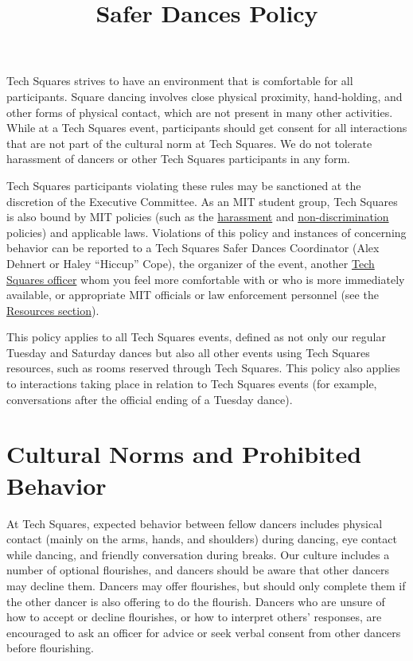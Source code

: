 \documentclass{article}
\title{Safer Dances Policy}
\date{}
\begin{document}
\maketitle

Tech Squares strives to have an environment that is comfortable for all participants. Square dancing involves close physical proximity, hand-holding, and other forms of physical contact, which are not present in many other activities. While at a Tech Squares event, participants should get consent for all interactions that are not part of the cultural norm at Tech Squares. We do not tolerate harassment of dancers or other Tech Squares participants in any form.

Tech Squares participants violating these rules may be sanctioned at the discretion of the Executive Committee. As an MIT student group, Tech Squares is also bound by MIT policies (such as the \href{http://handbook.mit.edu/harassment}{harassment} and \href{http://web.mit.edu/referencepubs/nondiscrimination/}{non-discrimination} policies) and applicable laws. Violations of this policy and instances of concerning behavior can be reported to a Tech Squares Safer Dances Coordinator (Alex Dehnert or Haley ``Hiccup'' Cope), the organizer of the event, another \href{http://www.mit.edu/\~{}tech-squares/officers.html}{Tech Squares officer} whom you feel more comfortable with or who is more immediately available, or appropriate MIT officials or law enforcement personnel (see the \hyperref[sec:resources]{Resources section}).

This policy applies to all Tech Squares events, defined as not only our regular Tuesday and Saturday dances but also all other events using Tech Squares resources, such as rooms reserved through Tech Squares. This policy also applies to interactions taking place in relation to Tech Squares events (for example, conversations after the official ending of a Tuesday dance).

\section{Cultural Norms and Prohibited Behavior}

At Tech Squares, expected behavior between fellow dancers includes physical contact (mainly on the arms, hands, and shoulders) during dancing, eye contact while dancing, and friendly conversation during breaks. Our culture includes a number of optional flourishes, and dancers should be aware that other dancers may decline them. Dancers may offer flourishes, but should only complete them if the other dancer is also offering to do the flourish. Dancers who are unsure of how to accept or decline flourishes, or how to interpret others' responses, are encouraged to ask an officer for advice or seek verbal consent from other dancers before flourishing.
\end{document}
